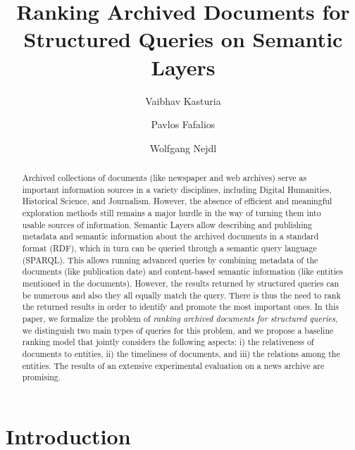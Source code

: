 \documentclass{libtex/llncs}
\begin{document}
\title{
    Ranking Archived Documents for Structured Queries on Semantic Layers%
}

\author{
    Vaibhav Kasturia \and
    Pavlos Fafalios \and
    Wolfgang Nejdl }




\maketitle


\begin{abstract}
Archived collections of documents (like newspaper and web archives)
serve as important information sources
in a variety disciplines, including Digital Humanities, Historical Science, and Journalism.
However, the absence of efficient and meaningful exploration methods
still remains a major hurdle in the way of turning them into usable sources of information.
Semantic Layers allow describing
and publishing metadata and semantic information about the archived documents in a standard format (RDF),
which in turn can be queried through a semantic query language (SPARQL).
This allows running advanced queries by combining
metadata of the documents (like publication date) and
content-based semantic information (like entities mentioned in the documents).
However, the results returned by structured queries
can be numerous and also they all equally match the query.
There is thus the need to rank the returned results in order to identify and promote the most important ones.
In this paper,
we formalize the problem of {\em ranking archived documents for structured queries},
we distinguish two main types of queries for this problem,
and we propose a baseline ranking model that jointly considers the following aspects:
i) the relativeness of documents to entities,
ii) the timeliness of documents, and
iii) the relations among the entities.
The results of an extensive experimental evaluation on a news archive are promising.
\end{abstract}



\section{Introduction}
\end{document}
